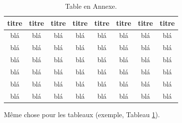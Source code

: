 \documentclass[letterpaper
, twoside
, 12pt
,these
,francais
,creativecommons,hyperref
]{thETS}
\begin{document}
\begin{table}
		\parbox{0.65\textwidth}{\caption{Table en Annexe.}\label{tab:testAp}}

		\begin{tabular}{|c|c|c|c|c|c|c|c|}
		\hline
			{\bf titre} & {\bf titre} & {\bf titre} & {\bf titre} & {\bf titre} & {\bf titre} & {\bf titre} & {\bf titre} \\
	  \hline
			blá & blá & blá & blá & blá & blá & blá & blá \\
	  \hline
			blá & blá & blá & blá & blá & blá & blá & blá \\
	  \hline
			blá & blá & blá & blá & blá & blá & blá & blá \\
	  \hline
			blá & blá & blá & blá & blá & blá & blá & blá \\
	  \hline
			blá & blá & blá & blá & blá & blá & blá & blá \\
	  \hline
			blá & blá & blá & blá & blá & blá & blá & blá \\
	  \hline
		\end{tabular}
\end{table}

Même chose pour les tableaux (exemple, Tableau \ref{tab:testAp}).



\newpage
\begin{spacing}{1}
	\nocite{*} %


\end{spacing}

\end{document}
